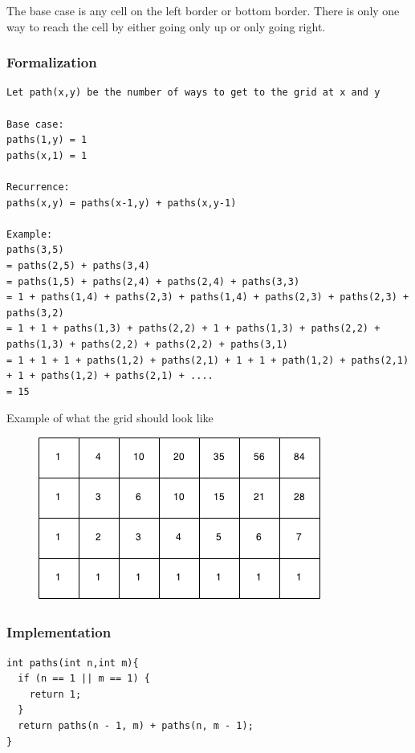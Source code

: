 \documentclass[11pt,oneside]{book}
\makeatletter
\def\maxwidth#1{\ifdim\Gin@nat@width>#1 #1\else\Gin@nat@width\fi}
\makeatother
\begin{document}
The base case is any cell on the left border or bottom border. There is only one way to reach the cell by either going only up or only going right.

\subsubsection{Formalization}

\begin{lstlisting}
Let path(x,y) be the number of ways to get to the grid at x and y

Base case:
paths(1,y) = 1
paths(x,1) = 1

Recurrence:
paths(x,y) = paths(x-1,y) + paths(x,y-1)

Example:
paths(3,5)
= paths(2,5) + paths(3,4)
= paths(1,5) + paths(2,4) + paths(2,4) + paths(3,3)
= 1 + paths(1,4) + paths(2,3) + paths(1,4) + paths(2,3) + paths(2,3) + paths(3,2)
= 1 + 1 + paths(1,3) + paths(2,2) + 1 + paths(1,3) + paths(2,2) + paths(1,3) + paths(2,2) + paths(2,2) + paths(3,1)
= 1 + 1 + 1 + paths(1,2) + paths(2,1) + 1 + 1 + path(1,2) + paths(2,1) + 1 + paths(1,2) + paths(2,1) + ....
= 15
\end{lstlisting}

Example of what the grid should look like

\vspace{5px}\begin{figure}[H]\centering
        \includegraphics[width=0.66\maxwidth{\textwidth}]{recursion_grid2.png}
        \end{figure}

\subsubsection{Implementation}

\begin{lstlisting}
int paths(int n,int m){
  if (n == 1 || m == 1) {
    return 1;
  }
  return paths(n - 1, m) + paths(n, m - 1);
}
\end{lstlisting}
\end{document}
